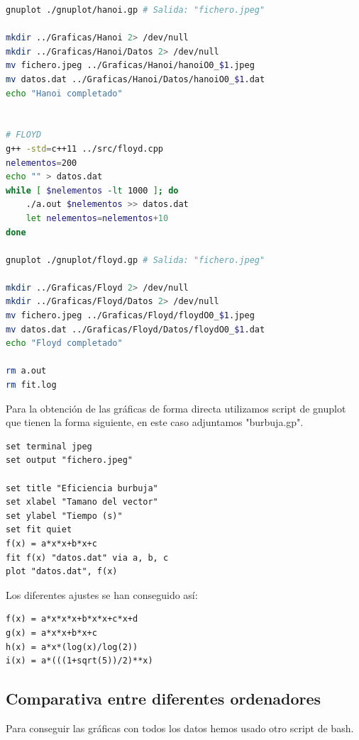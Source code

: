 \documentclass[11pt,spanish]{article} %
\begin{document}
\begin{lstlisting}[language=bash]
gnuplot ./gnuplot/hanoi.gp # Salida: "fichero.jpeg"

mkdir ../Graficas/Hanoi 2> /dev/null
mkdir ../Graficas/Hanoi/Datos 2> /dev/null
mv fichero.jpeg ../Graficas/Hanoi/hanoiO0_$1.jpeg
mv datos.dat ../Graficas/Hanoi/Datos/hanoiO0_$1.dat
echo "Hanoi completado"


# FLOYD
g++ -std=c++11 ../src/floyd.cpp
nelementos=200
echo "" > datos.dat
while [ $nelementos -lt 1000 ]; do
    ./a.out $nelementos >> datos.dat
    let nelementos=nelementos+10
done

gnuplot ./gnuplot/floyd.gp # Salida: "fichero.jpeg"

mkdir ../Graficas/Floyd 2> /dev/null
mkdir ../Graficas/Floyd/Datos 2> /dev/null
mv fichero.jpeg ../Graficas/Floyd/floydO0_$1.jpeg
mv datos.dat ../Graficas/Floyd/Datos/floydO0_$1.dat
echo "Floyd completado"

rm a.out
rm fit.log
\end{lstlisting}

Para la obtención de las gráficas de forma directa utilizamos script de gnuplot que tienen la forma siguiente, en este caso adjuntamos "burbuja.gp".

\begin{lstlisting}[language=gnuplot]
set terminal jpeg
set output "fichero.jpeg"

set title "Eficiencia burbuja"
set xlabel "Tamano del vector"
set ylabel "Tiempo (s)"
set fit quiet
f(x) = a*x*x+b*x+c
fit f(x) "datos.dat" via a, b, c
plot "datos.dat", f(x)
\end{lstlisting}

Los diferentes ajustes se han conseguido así:

\begin{lstlisting}[language=gnuplot]
f(x) = a*x*x*x+b*x*x+c*x+d
g(x) = a*x*x+b*x+c
h(x) = a*x*(log(x)/log(2))
i(x) = a*(((1+sqrt(5))/2)**x)
\end{lstlisting}

\subsection{Comparativa entre diferentes ordenadores}
Para conseguir las gráficas con  todos los datos hemos usado otro script de bash.
\end{document}
